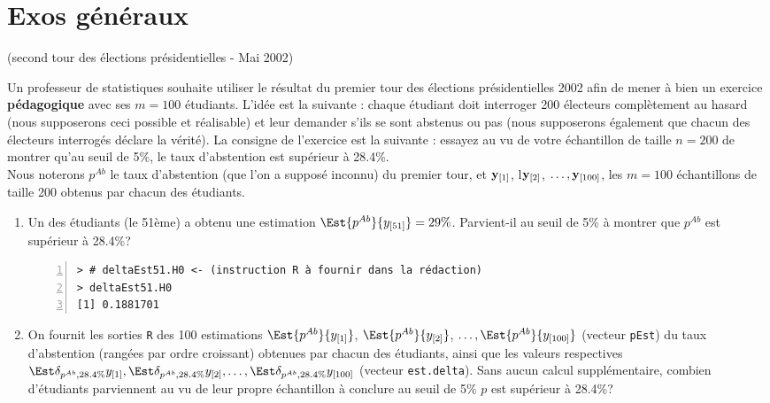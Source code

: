 \documentclass[10pt]{report}
\begin{document}
\chapter{Exos généraux}

\begin{exercice} (second tour des élections présidentielles - Mai 2002)

Un professeur de statistiques souhaite utiliser le r{\'e}sultat du premier tour des {\'e}lections pr{\'e}sidentielles 2002 afin de mener {\`a} bien un exercice {\bf p{\'e}dagogique} avec ses $m=100$ {\'e}tudiants. L'id{\'e}e est la suivante : chaque {\'e}tudiant doit interroger 200 {\'e}lecteurs compl{\`e}tement au hasard (nous supposerons ceci possible et r{\'e}alisable) et leur demander s'ils se sont abstenus ou pas (nous supposerons {\'e}galement que chacun des {\'e}lecteurs interrog{\'e}s d{\'e}clare la v{\'e}rit{\'e}). La consigne de l'exercice est la suivante : essayez au vu de votre {\'e}chantillon de taille $n=200$ de montrer qu'au seuil de 5\%, le taux d'abstention est sup{\'e}rieur {\`a} 28.4\%.\\

Nous noterons $p^{Ab}$ le taux d'abstention (que l'on a suppos{\'e} inconnu) du premier tour, et ${\bf y}_{[1]}$,  l${\bf y}_{[2]}$, $\ldots, {\bf y}_{[100]}$,  les $m=100$ {\'e}chantillons de taille 200 obtenus par chacun des {\'e}tudiants. \\

\begin{enumerate}
\item Un des {\'e}tudiants (le 51{\`e}me) a obtenu une estimation $\Est{p^{Ab}}{y_{[51]}}=29\%$. Parvient-il au seuil de 5\% {\`a} montrer que $p^{Ab}$ est sup{\'e}rieur {\`a} 28.4\%?

\IndicR
\begin{Verbatim}[frame=leftline,fontfamily=tt,fontshape=n,numbers=left]
> # deltaEst51.H0 <- (instruction R à fournir dans la rédaction)
> deltaEst51.H0
[1] 0.1881701
\end{Verbatim}





\item On fournit les sorties \verb+R+ des 100 estimations $\Est{p^{Ab}}{y_{[1]}}$, $\Est{p^{Ab}}{y_{[2]}}$, $\ldots, \Est{p^{Ab}}{y_{[100]}}$ (vecteur \verb+pEst+) du taux d'abstention (rang{\'e}es par ordre croissant) obtenues par chacun des {\'e}tudiants, ainsi que les valeurs respectives $\Est{\delta_{p^{Ab},28.4\%}}{y_{[1]}}, \Est{\delta_{p^{Ab},28.4\%}}{y_{[2]}},\ldots,\Est{\delta_{p^{Ab},28.4\%}}{y_{[100]}}$  (vecteur \verb+est.delta+). Sans aucun calcul suppl{\'e}mentaire, combien d'{\'e}tudiants parviennent au vu de leur propre {\'e}chantillon {\`a} conclure au seuil de 5\%  $p$ est sup{\'e}rieur {\`a} 28.4\%?




\end{enumerate}
\end{exercice}
\end{document}
